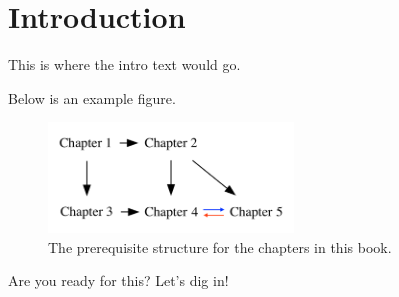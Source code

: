 

\chapter{Introduction}
\label{sec:introduction}

	This is where the intro text would go.
	
	
	Below is an example figure.

		\begin{figure}[htb]
		\centering
		\includegraphics[width=0.58\textwidth]{images/figures/dot/chap_prereqs.png}
		\vspace{-3mm}
		\caption{The prerequisite structure for the chapters in this book.\label{fig:chap_prereqs}}
		
	\end{figure}


	Are you ready for this? Let's dig in!

